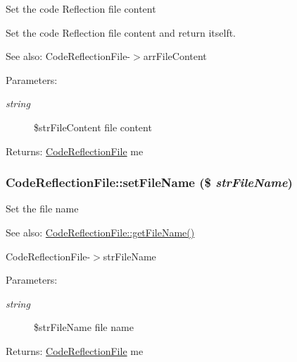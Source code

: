 Set the code Reflection file content

Set the code Reflection file content and return itselft.

\begin{Desc}
\item[See also:]CodeReflectionFile-$>$arrFileContent \end{Desc}
\begin{Desc}
\item[Parameters:]
\begin{description}
\item[{\em string}]\$strFileContent file content \end{description}
\end{Desc}
\begin{Desc}
\item[Returns:]\hyperlink{class_code_reflection_file}{CodeReflectionFile} me \end{Desc}
\hypertarget{class_code_reflection_file_17c133a6bfc041953b6054ca6137c1e9}{
\subsubsection[{setFileName}]{\setlength{\rightskip}{0pt plus 5cm}CodeReflectionFile::setFileName (\$ {\em strFileName})}}
\label{class_code_reflection_file_17c133a6bfc041953b6054ca6137c1e9}


Set the file name

\begin{Desc}
\item[See also:]\hyperlink{class_code_reflection_file_fd1320273fcd2bbeada22a40d33974ae}{CodeReflectionFile::getFileName()} 

CodeReflectionFile-$>$strFileName \end{Desc}
\begin{Desc}
\item[Parameters:]
\begin{description}
\item[{\em string}]\$strFileName file name \end{description}
\end{Desc}
\begin{Desc}
\item[Returns:]\hyperlink{class_code_reflection_file}{CodeReflectionFile} me \end{Desc}



